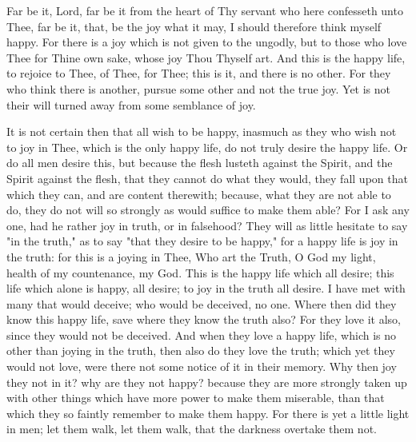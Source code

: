 \documentclass[b5paper,openright,12pt,twoside]{book}
\begin{document}
Far be it, Lord, far be it from the heart of Thy servant who here
confesseth unto Thee, far be it, that, be the joy what it may, I should
therefore think myself happy. For there is a joy which is not given to
the ungodly, but to those who love Thee for Thine own sake, whose joy
Thou Thyself art. And this is the happy life, to rejoice to Thee, of
Thee, for Thee; this is it, and there is no other. For they who think
there is another, pursue some other and not the true joy. Yet is not
their will turned away from some semblance of joy.

It is not certain then that all wish to be happy, inasmuch as they who
wish not to joy in Thee, which is the only happy life, do not truly
desire the happy life. Or do all men desire this, but because the flesh
lusteth against the Spirit, and the Spirit against the flesh, that they
cannot do what they would, they fall upon that which they can, and are
content therewith; because, what they are not able to do, they do not
will so strongly as would suffice to make them able? For I ask any
one, had he rather joy in truth, or in falsehood? They will as little
hesitate to say "in the truth," as to say "that they desire to be
happy," for a happy life is joy in the truth: for this is a joying in
Thee, Who art the Truth, O God my light, health of my countenance, my
God. This is the happy life which all desire; this life which alone is
happy, all desire; to joy in the truth all desire. I have met with many
that would deceive; who would be deceived, no one. Where then did they
know this happy life, save where they know the truth also? For they love
it also, since they would not be deceived. And when they love a happy
life, which is no other than joying in the truth, then also do they love
the truth; which yet they would not love, were there not some notice of
it in their memory. Why then joy they not in it? why are they not happy?
because they are more strongly taken up with other things which have
more power to make them miserable, than that which they so faintly
remember to make them happy. For there is yet a little light in men; let
them walk, let them walk, that the darkness overtake them not.
\end{document}
